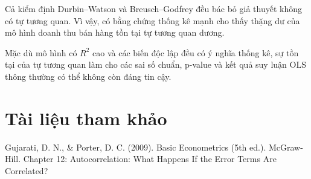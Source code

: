 \documentclass[12pt,a4paper]{article}
\begin{document}
Cả kiểm định Durbin--Watson và Breusch--Godfrey đều bác bỏ giả thuyết
không có tự tương quan. Vì vậy, có bằng chứng thống kê mạnh cho thấy
thặng dư của mô hình doanh thu bán hàng tồn tại tự tương quan dương.

Mặc dù mô hình có $R^2$ cao và các biến độc lập đều có ý nghĩa thống kê,
sự tồn tại của tự tương quan làm cho các sai số chuẩn, p-value và kết quả
suy luận OLS thông thường có thể không còn đáng tin cậy.

\section{Tài liệu tham khảo}\label{tuxe0i-liux1ec7u-tham-khux1ea3o}

Gujarati, D. N., \& Porter, D. C. (2009). Basic Econometrics (5th ed.).
McGraw-Hill. Chapter 12: Autocorrelation: What Happens If the Error
Terms Are Correlated?
\end{document}

